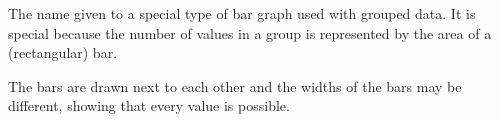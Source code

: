 The name given to a special type of bar graph used with grouped data.  It is special because the number of values in a group is represented by the area of a (rectangular) bar.

\par
The bars are drawn next to each other and the widths of the bars may be different, showing that every value is possible.
